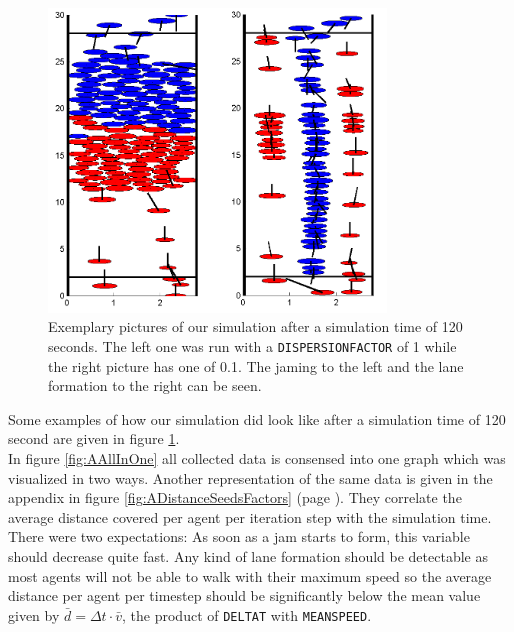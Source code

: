 
\begin{figure}[h!]
	\centering
		\includegraphics[width=0.8\textwidth]{pictures/ex2picture.png}
	\caption{Exemplary pictures of our simulation after a simulation time of 120 seconds. The left one was run with a \texttt{DISPERSIONFACTOR} of 1 while the right picture has one of 0.1. The jaming to the left and the lane formation to the right can be seen.}
	\label{fig:ex2picture}
\end{figure}

\noi Some examples of how our simulation did look like after a simulation time of 120 second are given in figure \ref{fig:ex2picture}.\\

\noi In figure \ref{fig:AAllInOne} all collected data is consensed into one graph which was visualized in two ways. Another representation of the same data is given in the appendix in figure \ref{fig:ADistanceSeedsFactors} (page \pageref{fig:ADistanceSeedsFactors}). They correlate the average distance covered per agent per iteration step with the simulation time. There were two expectations: As soon as a jam starts to form, this variable should decrease quite fast. Any kind of lane formation should be detectable as most agents will not be able to walk with their maximum speed so the average distance per agent per timestep should be significantly below the mean value given by $\bar{d} = \Delta t \cdot \bar{v}$, the product of \texttt{DELTAT} with \texttt{MEANSPEED}.\\


